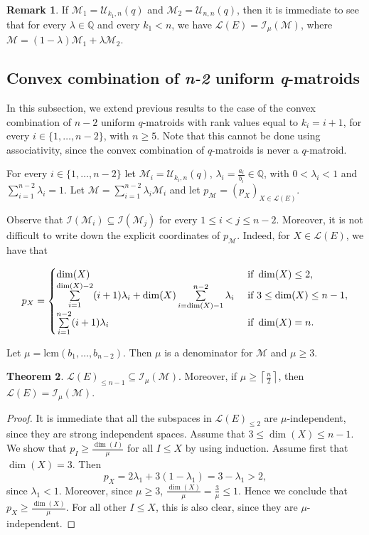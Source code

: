 \documentclass[a4paper,11pt,reqno]{amsart}
\theoremstyle{definition}
\newtheorem{theorem}{Theorem}[section]
\newtheorem{remark}[theorem]{{{Remark}}}
\newcommand{\mM}{\mathcal{M}}
\newcommand{\mL}{\mathcal{L}}
\newcommand{\mU}{\mathcal{U}}
\newcommand{\mI}{\mathcal{I}}
\begin{document}
{\begin{remark}
    If $\mM_1=\mU_{k_1,n}(q)$ and $\mM_2=\mU_{n,n}(q)$, then it is immediate to see that for every $\lambda\in\mathbb{Q}$ and every $k_1<n$, we have $\mL(E)= \mI_\mu(\mM)$, where $\mM=(1-\lambda)\mM_1+\lambda\mM_2$.
\end{remark}


\subsection{Convex combination of \emph{n-2} uniform \emph{q}-matroids}
In this subsection, we extend previous results to the case of the convex combination of $n-2$ uniform $q$-matroids with rank values equal to $k_i=i+1$, for every $i\in\{1,\ldots,n-2\}$, with $n\geq 5$. Note that this cannot be done using associativity, since the convex combination of $q$-matroids is never a $q$-matroid.

For every $i\in\{1,\ldots,n-2\}$ let $\mM_i=\mU_{k_i,n}(q)$, $\lambda_i=\frac{a_i}{b_i}\in\mathbb{Q}$, with $0<\lambda_i<1$ and $\sum\limits_{i=1}^{n-2}\lambda_i=1$. Let $\mM = \sum\limits_{i=1}^{n-2}\lambda_i\mM_i$ and let $p_\mM=(p_X)_{X\in\mL(E)}$. 


Observe that $\mI(\mM_i)\subseteq \mI(\mM_j)$ for every $1\leq i <j\leq n-2$. Moreover, it is not difficult to write down the explicit coordinates of $p_\mM$. Indeed, for $X\in\mL(E)$, we have that

$$p_X=\begin{cases}
    \dim(X) & \textnormal{ if } \dim(X)\leq 2, \\
    \sum\limits_{i=1}^{\dim(X)-2}(i+1)\lambda_i + \dim(X)\sum\limits_{i=\dim(X)-1}^{n-2}\lambda_i & \textnormal{ if } 3\leq \dim(X)\leq n-1, \\
    \sum\limits_{i=1}^{n-2}(i+1)\lambda_i & \textnormal{ if } \dim(X)=n.
\end{cases}$$

Let $\mu=\mathrm{lcm}(b_1,\ldots,b_{n-2})$. Then $\mu$ is a denominator for $\mM$ and $\mu\geq 3$.

\begin{theorem}\label{thm:mu_indep_flag_uniform}
$\mL(E)_{\leq n-1} \subseteq \mI_{\mu}(\mM)$.  Moreover, if $\mu\geq \left\lceil \frac{n}{2}\right\rceil$, then $\mL(E)=\mI_\mu(\mM)$.
\end{theorem}
\begin{proof}
  It is immediate that all the subspaces in $\mL(E)_{\leq 2}$ are $\mu$-independent, since they are strong independent spaces. Assume that $3\leq \dim(X)\leq n-1$. We show that $p_I\geq \frac{\dim(I)}{\mu}$ for all $I\leq X$ by using induction. Assume first that $\dim(X)=3$. Then
 $$p_X = 2\lambda_1 +3(1-\lambda_1)=3-\lambda_1>2,$$
 since $\lambda_1<1$. Moreover, since $\mu\geq 3$,  $\frac{\dim(X)}{\mu} = \frac{3}{\mu} \leq 1$. Hence we conclude that $p_X\geq \frac{\dim(X)}{\mu}$. For all other $I\leq X$, this is also clear, since they are $\mu$-independent. 


\end{proof}}
\end{document}
